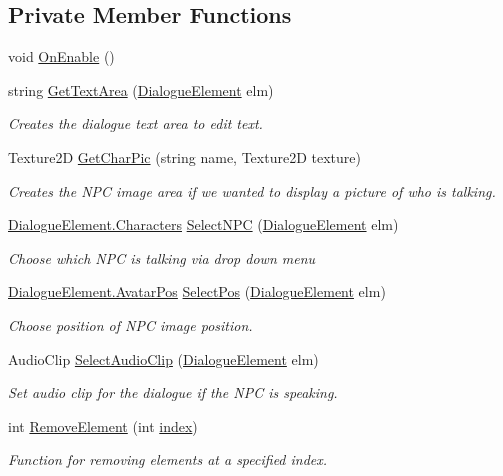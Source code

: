 \subsection*{Private Member Functions}
\begin{DoxyCompactItemize}
\item 
void \mbox{\hyperlink{class_dialogue_editor_a021f39e2fd0e5ba4c1d325785e73e073}{On\+Enable}} ()
\item 
string \mbox{\hyperlink{class_dialogue_editor_a7c45fc0781ade3441db9948bc4b3ec39}{Get\+Text\+Area}} (\mbox{\hyperlink{class_dialogue_element}{Dialogue\+Element}} elm)
\begin{DoxyCompactList}\small\item\em Creates the dialogue text area to edit text. \end{DoxyCompactList}\item 
Texture2D \mbox{\hyperlink{class_dialogue_editor_a797c90eb2333c7e9421917ecef6da189}{Get\+Char\+Pic}} (string name, Texture2D texture)
\begin{DoxyCompactList}\small\item\em Creates the N\+PC image area if we wanted to display a picture of who is talking. \end{DoxyCompactList}\item 
\mbox{\hyperlink{class_dialogue_element_ae49b75aacbe9e237b4801a4153dd1bfa}{Dialogue\+Element.\+Characters}} \mbox{\hyperlink{class_dialogue_editor_a9bc812d2ac0daea075c7c6d408a524dd}{Select\+N\+PC}} (\mbox{\hyperlink{class_dialogue_element}{Dialogue\+Element}} elm)
\begin{DoxyCompactList}\small\item\em Choose which N\+PC is talking via drop down menu \end{DoxyCompactList}\item 
\mbox{\hyperlink{class_dialogue_element_a4713e15d24a53d5487f1d51b89cd55ee}{Dialogue\+Element.\+Avatar\+Pos}} \mbox{\hyperlink{class_dialogue_editor_a91ae346ba8ec20e732d1dfc3eb12aad4}{Select\+Pos}} (\mbox{\hyperlink{class_dialogue_element}{Dialogue\+Element}} elm)
\begin{DoxyCompactList}\small\item\em Choose position of N\+PC image position. \end{DoxyCompactList}\item 
Audio\+Clip \mbox{\hyperlink{class_dialogue_editor_a004ee96b1b14c0daab83f8ca66af7d60}{Select\+Audio\+Clip}} (\mbox{\hyperlink{class_dialogue_element}{Dialogue\+Element}} elm)
\begin{DoxyCompactList}\small\item\em Set audio clip for the dialogue if the N\+PC is speaking. \end{DoxyCompactList}\item 
int \mbox{\hyperlink{class_dialogue_editor_a4f9858a733113b0dab1177ac806a43d0}{Remove\+Element}} (int \mbox{\hyperlink{class_dialogue_editor_a283d0bf74d897ae870ad3bdc7c7dcd2a}{index}})
\begin{DoxyCompactList}\small\item\em Function for removing elements at a specified index. \end{DoxyCompactList}\end{DoxyCompactItemize}
